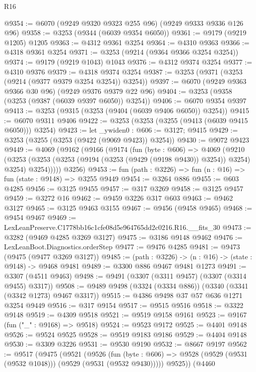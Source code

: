 \begin{lexlean}{R16}
\begin{coremodule}
@9354 := @6070 (@9249 @9320 @9323 @255 @96) (@9249 @9333 @9336 @126 @96)
@9358 := @3253 (@9344 (@6039 @9354 @6050))
@9361 := @9179 (@9219 @1205) @1205
@9363 := @4312 @9361 @3254
@9364 := @4310 @9363
@9366 := @4318 @9361 @3254
@9371 := @3253 (@9214 (@9364 @9366 @3254 @3254))
@9374 := @9179 (@9219 @1043) @1043
@9376 := @4312 @9374 @3254
@9377 := @4310 @9376
@9379 := @4318 @9374 @3254
@9387 := @3253 (@9371 (@3253 (@9214 (@9377 @9379 @3254 @3254)) @3254))
@9397 := @6070 (@9249 @9363 @9366 @30 @96) (@9249 @9376 @9379 @22 @96)
@9404 := @3253 (@9358 (@3253 (@9387 (@6039 @9397 @6050)) @3254))
@9406 := @6070 @9354 @9397
@9413 := @3253 (@9315 (@3253 (@9404 (@6039 @9406 @6050)) @3254))
@9415 := @6070 @9311 @9406
@9422 := @3253 (@3253 (@3255 (@9413 (@6039 @9415 @6050))) @3254)
@9423 := let _ywiden0 : @606 := @3127; @9415
@9429 := @3253 (@3255 (@3253 (@9422 (@9069 @9423)) @3254))
@9430 := @9072 @9423
@9449 := @4069
    (@9162
      (@9166
        (@9174
          (fun (byte : @606) =>
          @4069
            (@9210
              (@3253
                (@3253 (@3253 (@9194 (@3253 (@9429 (@9198 @9430)) @3254)) @3254) @3254)
                @3254)))))
      @3256)
@9453 := fun (path : @3226) => fun (n : @16) => fun (state : @9148) => @3255 @9449
@9454 := @3264 @886
@9455 := @603 @4285
@9456 := @3125 @9455
@9457 := @317 @3269
@9458 := @3125 @9457
@9459 := @3272 @16
@9462 := @9459 @3226 @317 @603
@9463 := @9462 @3127
@9465 := @3125 @9463 @3155
@9467 := @9456 (@9458 @9465)
@9468 := @9454 @9467
@9469 := LexLeanPreserve.C1778bb16c1cfe08d5e964765dd2c0216.R16.__fits_30
@9473 := @3282 (@9469 @4285 @3269 @3127)
@9475 := @3186 @9148 @9462
@9476 := LexLeanBoot.Diagnostics.orderStep
@9477 := @9476 @4285
@9481 := @9473 (@9475 (@9477 @3269 @3127))
@9485 := (path : @3226) -> (n : @16) -> (state : @9148) -> @9468 @9481
@9489 := @3300 @886 @9467 @9481 @1273
@9491 := @3307 (@4511 @9463)
@9498 := @9491 (@3307 (@3311 @9457) (@3307 (@3314 @9455) @3317))
@9508 := @9489 @9498 (@3324 (@3334 @886)) (@3340 (@3341 (@3342 @1273) @9467 @3317))
@9515 := @4386 @9498 @37 @57 @636 @1271 @3254 @9449
@9516 := @317 @9154
@9517 := @9515 @9516
@9518 := @3322 @9148
@9519 := @4309 @9518
@9521 := @9519 @9158 @9161
@9523 := @9167 (fun ("_" : @9168) => @9518)
@9524 := @9523 @9172
@9525 := @4401 @9148
@9526 := @9524 @9525
@9528 := @9519 @9183 @9186
@9529 := @4404 @9148
@9530 := @3309 @3226
@9531 := @9530 @9190
@9532 := @8667 @9197
@9562 := @9517
    (@9475
      (@9521
        (@9526
          (fun (byte : @606) => @9528 (@9529 (@9531 (@9532 @1048))) (@9529 (@9531 (@9532 @9430)))))
        @9525))
    (@4460

\end{coremodule}
\end{lexlean}
